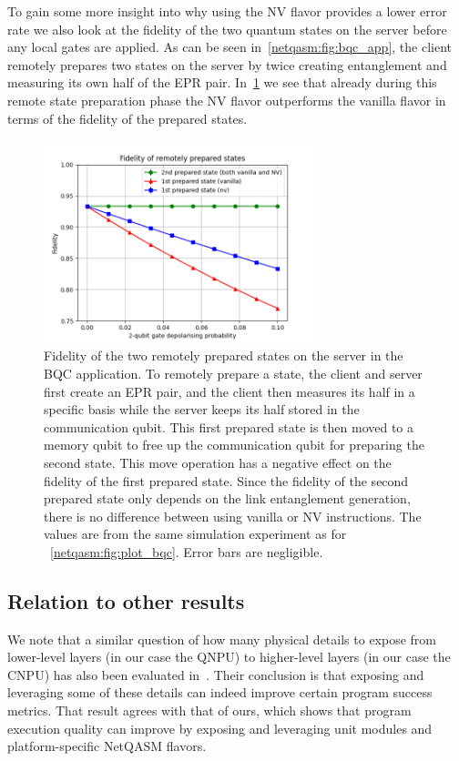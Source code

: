 To gain some more insight into why using the NV flavor provides a lower error rate we also look at the fidelity of the two quantum states on the server before any local gates are applied.
As can be seen in~\cref{netqasm:fig:bqc_app}, the client remotely prepares two states on the server by twice creating entanglement and measuring its own half of the EPR pair.
In~\cref{netqasm:fig:plot_bqc_fidelity} we see that already during this remote state preparation phase the NV flavor outperforms the vanilla flavor in terms of the fidelity of the prepared states.

\begin{figure}[t]
  \centering
  \includegraphics[width=0.7\textwidth]{figures/netqasm/plots/bqc_sweep_gate_noise_epr_fidelity.png}
  \caption{ Fidelity of the two remotely prepared states on the server in
        the BQC application. To remotely prepare a state, the client and server
        first create an EPR pair, and the client then measures its half in a
        specific basis while the server keeps its half stored in the
        communication qubit. This first prepared state is then moved to a memory
        qubit to free up the communication qubit for preparing the second state.
        This move operation has a negative effect on the fidelity of the first
        prepared state. Since the fidelity of the second prepared state only
        depends on the link entanglement generation, there is no difference
        between using vanilla or NV instructions. The values are from the same
        simulation experiment as for ~\cref{netqasm:fig:plot_bqc}. Error bars are
        negligible.}
  \label{netqasm:fig:plot_bqc_fidelity}
\end{figure}

\subsection{Relation to other results}
We note that a similar question of how many physical details to expose from lower-level layers (in our case the \ac{QNPU}) to higher-level layers (in our case the \ac{CNPU}) has also been evaluated in~\cite{murali2019fullstack}.
Their conclusion is that exposing and leveraging some of these details can indeed improve certain program success metrics.
That result agrees with that of ours, which shows that program execution quality can improve by exposing and leveraging unit modules and platform-specific \ac{NetQASM} flavors.

